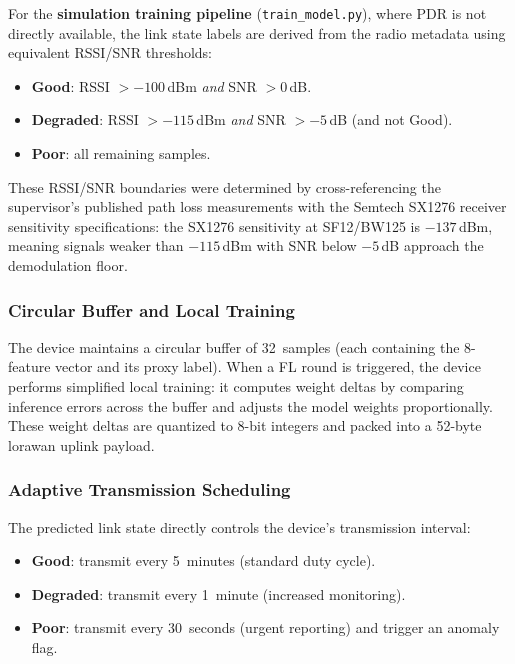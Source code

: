 \documentclass[12pt, a4paper, twoside, openright]{report}
\begin{document}
For the \textbf{simulation training pipeline} (\texttt{train\_model.py}), where PDR is not directly available, the link state labels are derived from the radio metadata using equivalent RSSI/SNR thresholds:
\begin{itemize}
  \item \textbf{Good}: RSSI $> -100$\,dBm \textit{and} SNR $> 0$\,dB.
  \item \textbf{Degraded}: RSSI $> -115$\,dBm \textit{and} SNR $> -5$\,dB (and not Good).
  \item \textbf{Poor}: all remaining samples.
\end{itemize}

\noindent
These RSSI/SNR boundaries were determined by cross-referencing the supervisor's published path loss measurements with the Semtech SX1276 receiver sensitivity specifications: the SX1276 sensitivity at SF12/BW125 is $-137$\,dBm, meaning signals weaker than $-115$\,dBm with SNR below $-5$\,dB approach the demodulation floor.

\subsubsection{Circular Buffer and Local Training}
The device maintains a circular buffer of 32~samples (each containing the 8-feature vector and its proxy label). When a FL round is triggered, the device performs simplified local training: it computes weight deltas by comparing inference errors across the buffer and adjusts the model weights proportionally. These weight deltas are quantized to 8-bit integers and packed into a 52-byte \gls{lorawan} uplink payload.

\subsubsection{Adaptive Transmission Scheduling}
The predicted link state directly controls the device's transmission interval:
\begin{itemize}
  \item \textbf{Good}: transmit every 5~minutes (standard duty cycle).
  \item \textbf{Degraded}: transmit every 1~minute (increased monitoring).
  \item \textbf{Poor}: transmit every 30~seconds (urgent reporting) and trigger an anomaly flag.
\end{itemize}
\end{document}
